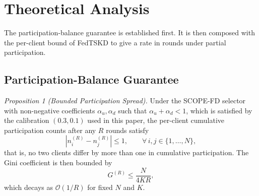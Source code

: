 \documentclass[journal]{IEEEtran}
\newcommand{\rev}[1]{#1}
\begin{document}
\section{Theoretical Analysis}
\label{sec:theory}

The participation-balance guarantee is established first. \rev{It is then composed with the per-client bound of FedTSKD \cite{mu2024fedtskd} to give a rate in rounds under partial participation.}

\subsection{Participation-Balance Guarantee}
\label{ssec:participation-balance}

\textit{Proposition 1 (Bounded Participation Spread).} Under the SCOPE-FD selector with non-negative coefficients $\alpha_u, \alpha_d$ such that $\alpha_u + \alpha_d < 1$, which is satisfied by the calibration $(0.3, 0.1)$ used in this paper, the per-client cumulative participation counts after any $R$ rounds satisfy
\begin{equation}
\left| n_i^{(R)} - n_j^{(R)} \right| \le 1, \qquad \forall\, i,j \in \{1,\dots,N\},
\label{eq:spread}
\end{equation}
that is, no two clients differ by more than one in cumulative participation. The Gini coefficient is then bounded by
\begin{equation}
G^{(R)} \le \frac{N}{4KR},
\label{eq:gini_bound}
\end{equation}
which decays as $\mathcal{O}(1/R)$ for fixed $N$ and $K$.
\end{document}

